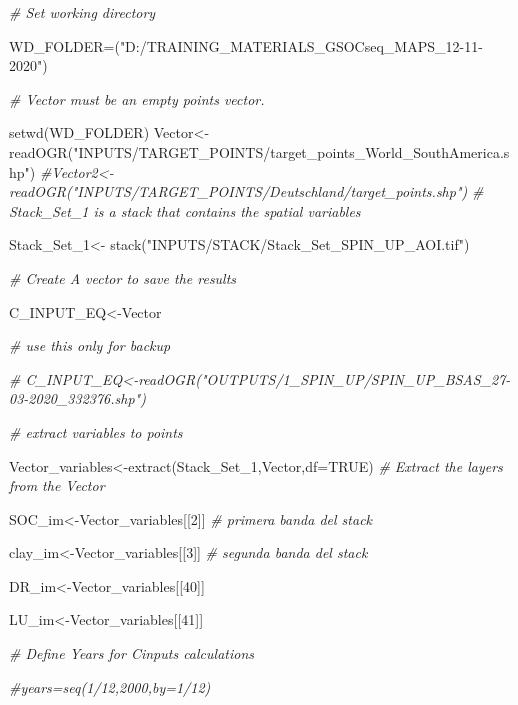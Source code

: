 \documentclass[
  10pt,
  b5paper,
]{book}
\newenvironment{Shaded}{\begin{snugshade}}{\end{snugshade}}
\newcommand{\AttributeTok}[1]{\textcolor[rgb]{0.77,0.63,0.00}{#1}}
\newcommand{\CommentTok}[1]{\textcolor[rgb]{0.56,0.35,0.01}{\textit{#1}}}
\newcommand{\ConstantTok}[1]{\textcolor[rgb]{0.00,0.00,0.00}{#1}}
\newcommand{\DecValTok}[1]{\textcolor[rgb]{0.00,0.00,0.81}{#1}}
\newcommand{\FunctionTok}[1]{\textcolor[rgb]{0.00,0.00,0.00}{#1}}
\newcommand{\NormalTok}[1]{#1}
\newcommand{\OtherTok}[1]{\textcolor[rgb]{0.56,0.35,0.01}{#1}}
\newcommand{\StringTok}[1]{\textcolor[rgb]{0.31,0.60,0.02}{#1}}
\begin{document}
\begin{Shaded}
\begin{Highlighting}[]
\CommentTok{\# Set working directory }

\NormalTok{WD\_FOLDER}\OtherTok{=}\NormalTok{(}\StringTok{"D:/TRAINING\_MATERIALS\_GSOCseq\_MAPS\_12{-}11{-}2020"}\NormalTok{)}

\CommentTok{\# Vector must be an empty points vector. }

\FunctionTok{setwd}\NormalTok{(WD\_FOLDER)}
\NormalTok{Vector}\OtherTok{\textless{}{-}}\FunctionTok{readOGR}\NormalTok{(}\StringTok{"INPUTS/TARGET\_POINTS/target\_points\_World\_SouthAmerica.shp"}\NormalTok{)}
\CommentTok{\#Vector2\textless{}{-}readOGR("INPUTS/TARGET\_POINTS/Deutschland/target\_points.shp")}
\CommentTok{\# Stack\_Set\_1 is a stack that contains the spatial variables }

\NormalTok{Stack\_Set\_1}\OtherTok{\textless{}{-}} \FunctionTok{stack}\NormalTok{(}\StringTok{"INPUTS/STACK/Stack\_Set\_SPIN\_UP\_AOI.tif"}\NormalTok{)}

\CommentTok{\# Create A vector to save the results}

\NormalTok{C\_INPUT\_EQ}\OtherTok{\textless{}{-}}\NormalTok{Vector}

\CommentTok{\# use this only for backup}

\CommentTok{\# C\_INPUT\_EQ\textless{}{-}readOGR("OUTPUTS/1\_SPIN\_UP/SPIN\_UP\_BSAS\_27{-}03{-}2020\_332376.shp")}

\CommentTok{\# extract variables to points}

\NormalTok{Vector\_variables}\OtherTok{\textless{}{-}}\FunctionTok{extract}\NormalTok{(Stack\_Set\_1,Vector,}\AttributeTok{df=}\ConstantTok{TRUE}\NormalTok{)}
\CommentTok{\# Extract the layers from the Vector}

\NormalTok{SOC\_im}\OtherTok{\textless{}{-}}\NormalTok{Vector\_variables[[}\DecValTok{2}\NormalTok{]] }\CommentTok{\# primera banda del stack}

\NormalTok{clay\_im}\OtherTok{\textless{}{-}}\NormalTok{Vector\_variables[[}\DecValTok{3}\NormalTok{]] }\CommentTok{\# segunda banda del stack }

\NormalTok{DR\_im}\OtherTok{\textless{}{-}}\NormalTok{Vector\_variables[[}\DecValTok{40}\NormalTok{]]}

\NormalTok{LU\_im}\OtherTok{\textless{}{-}}\NormalTok{Vector\_variables[[}\DecValTok{41}\NormalTok{]]}

\CommentTok{\# Define Years for Cinputs calculations}

\CommentTok{\#years=seq(1/12,2000,by=1/12)}
\end{Highlighting}
\end{Shaded}
\end{document}

